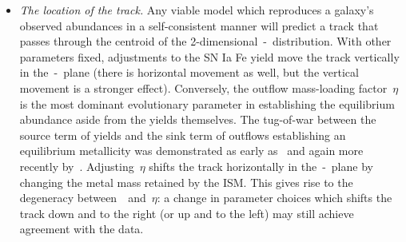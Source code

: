 \documentclass[ms.tex]{subfiles}
\begin{document}
\begin{itemize}
\begin{itemize}
		\item \textit{The location of the track.}
		Any viable model which reproduces a galaxy's observed abundances in a
		self-consistent manner will predict a track that passes through the
		centroid of the 2-dimensional~\afe-\feh~distribution.
		With other parameters fixed, adjustments to the SN Ia Fe yield move the
		track vertically in the~\afe-\feh~plane (there is horizontal movement
		as well, but the vertical movement is a stronger effect).
		Conversely, the outflow mass-loading factor~$\eta$ is the most dominant
		evolutionary parameter in establishing the equilibrium abundance aside
		from the yields themselves.
		The tug-of-war between the source term of yields and the sink term of
		outflows establishing an equilibrium metallicity was demonstrated as
		early as~\citet{Larson1974} and again more recently
		by~\citet{Weinberg2017}.
		Adjusting~$\eta$ shifts the track horizontally in the~\afe-\feh~plane
		by changing the metal mass retained by the ISM.
		This gives rise to the degeneracy between~\yfeia~and~$\eta$: a change
		in parameter choices which shifts the track down and to the right (or
		up and to the left) may still achieve agreement with the data.


\end{itemize}
\end{itemize}
\end{document}
